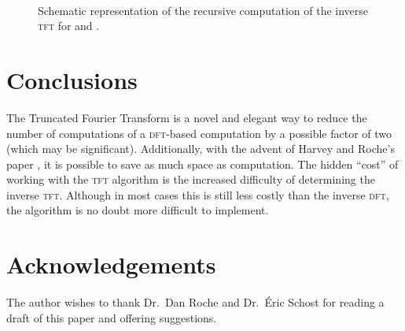 \documentclass[12pt]{article}
\theoremstyle{definition}
\newcommand{\0}{\mathbf{0}}
\theoremstyle{theorem}
\theoremstyle{definition}
\begin{document}
\begin{figure}[p]
~
~
~
~
~
~
\caption[Optional caption for list of figures]{Schematic representation of the recursive computation of the inverse \textsc{tft} for  and . }
\label{BigInvTFT}
\end{figure}

\section{Conclusions}
The Truncated Fourier Transform is a novel and elegant way to reduce the number of computations of a \textsc{dft}-based computation by a possible factor of two (which may be significant). Additionally, with the advent of Harvey and Roche's paper \cite{InPlaceTFT}, it is possible to save as much space as computation. The hidden ``cost'' of working with the \textsc{tft} algorithm is the increased difficulty of determining the inverse \textsc{tft}. Although in most cases this is still less costly than the inverse \textsc{dft}, the algorithm is no doubt more difficult to implement.

\section*{Acknowledgements}
The author wishes to thank Dr.\ Dan Roche and Dr.\ \'Eric Schost for reading a draft of this paper and offering suggestions. 



\end{document}
